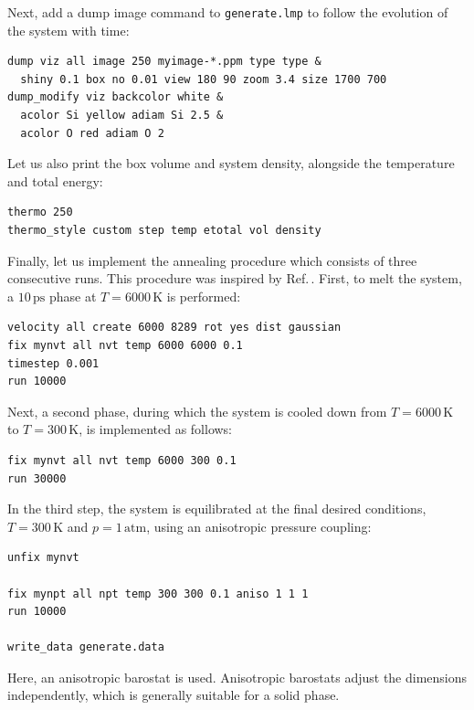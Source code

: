 \documentclass[9pt,tutorial]{livecoms}
\newcommand{\lmpcmd}[1]{\hspace{0pt}\colorbox{listing}{\textcolor{command}{\small{#1}}}\hspace{0pt}} %
\newcommand{\flecmd}[1]{\textcolor{command}{\texttt{#1}}} %
\begin{document}
Next, add a \lmpcmd{dump image} command to \flecmd{generate.lmp} to follow the
evolution of the system with time:
\begin{lstlisting}
dump viz all image 250 myimage-*.ppm type type &
  shiny 0.1 box no 0.01 view 180 90 zoom 3.4 size 1700 700
dump_modify viz backcolor white &
  acolor Si yellow adiam Si 2.5 &
  acolor O red adiam O 2
\end{lstlisting}
Let us also print the box volume and system density, alongside the
temperature and total energy:
\begin{lstlisting}
thermo 250
thermo_style custom step temp etotal vol density
\end{lstlisting}

Finally, let us implement the annealing procedure which
consists of three consecutive runs.  This procedure was inspired
by Ref.\,\cite{della1992molecular}.  First, to melt the system,
a $10\,\text{ps}$ phase at $T = 6000\,\text{K}$ is performed:
\begin{lstlisting}
velocity all create 6000 8289 rot yes dist gaussian
fix mynvt all nvt temp 6000 6000 0.1
timestep 0.001
run 10000
\end{lstlisting}
Next, a second phase, during which the system is cooled down from $T = 6000\,\text{K}$
to $T = 300\,\text{K}$, is implemented as follows:
\begin{lstlisting}
fix mynvt all nvt temp 6000 300 0.1
run 30000
\end{lstlisting}
In the third step, the system is equilibrated at the final desired
conditions, $T = 300\,\text{K}$ and $p = 1\,\text{atm}$,
using an anisotropic pressure coupling:
\begin{lstlisting}
unfix mynvt

fix mynpt all npt temp 300 300 0.1 aniso 1 1 1
run 10000

write_data generate.data
\end{lstlisting}
Here, an anisotropic barostat is used.
Anisotropic barostats adjust the dimensions independently, which is
generally suitable for a solid phase.
\end{document}
